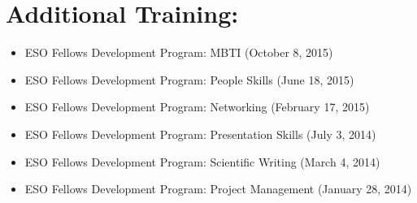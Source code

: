 \section*{Additional Training:}
\begin{itemize}
    \item ESO Fellows Development Program: MBTI (October 8, 2015)
    \item ESO Fellows Development Program: People Skills (June 18, 2015)
    \item ESO Fellows Development Program: Networking (February 17, 2015)
    \item ESO Fellows Development Program: Presentation Skills (July 3, 2014)
    \item ESO Fellows Development Program: Scientific Writing (March 4, 2014)
    \item ESO Fellows Development Program: Project Management (January 28, 2014)
\end{itemize}

